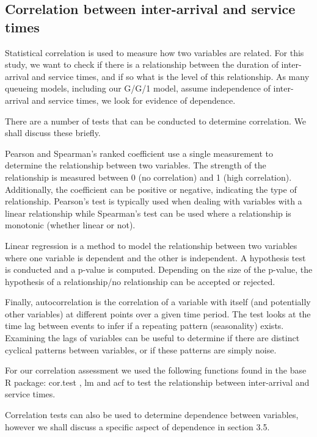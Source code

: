 \documentclass[5p]{elsarticle}
\begin{document}
\subsection{Correlation between inter-arrival and service times}

Statistical correlation is used to measure how two variables are related. For this study, we want to check if there is a relationship between the duration of inter-arrival and service times, and if so what is the level of this relationship. As many queueing models, including our G/G/1 model, assume independence of inter-arrival and service times, we look for evidence of dependence.

There are a number of tests that can be conducted to determine correlation. We shall discuss these briefly.

Pearson \cite{fisher1915frequency} and Spearman's \cite{spearman1904proof} ranked coefficient use a single measurement to determine the relationship between two variables. The strength of the relationship is measured between 0 (no correlation) and 1 (high correlation). Additionally, the coefficient can be positive or negative, indicating the type of relationship. Pearson's test is typically used when dealing with variables with a linear relationship while Spearman's test can be used where a relationship is monotonic (whether linear or not). 

Linear regression \cite{galton1890kinship} is a method to model the relationship between two variables where one variable is dependent and the other is independent. A hypothesis test is conducted and a p-value is computed. Depending on the size of the p-value, the hypothesis of a relationship/no relationship can be accepted or rejected.

Finally, autocorrelation \cite{box1970distribution} is the correlation of a variable with itself (and potentially other variables) at different points over a given time period. The test looks at the time lag between events to infer if a repeating pattern (seasonality) exists. Examining the lags of variables can be useful to determine if there are distinct cyclical patterns between variables, or if these patterns are simply noise.

For our correlation assessment we used the following functions found in the base R package: cor.test \cite{PearSpearR}, lm \cite{lmR} and acf \cite{acfR} to test the relationship between inter-arrival and service times.

Correlation tests can also be used to determine dependence between variables, however we shall discuss a specific aspect of dependence in section 3.5. 
\end{document}
